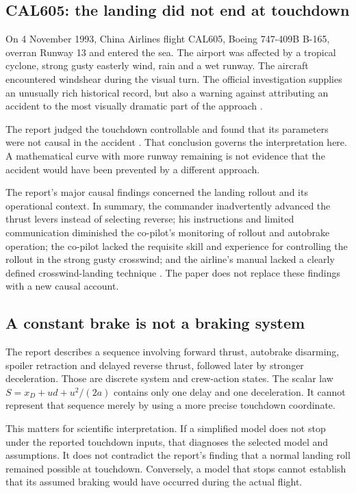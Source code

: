 \label{part:6}
\subsection*{CAL605: the landing did not end at touchdown}
On 4 November 1993, China Airlines flight CAL605, Boeing 747-409B B-165, overran Runway 13 and entered the sea. The airport was affected by a tropical cyclone, strong gusty easterly wind, rain and a wet runway. The aircraft encountered windshear during the visual turn. The official investigation supplies an unusually rich historical record, but also a warning against attributing an accident to the most visually dramatic part of the approach \citep{cad}.

The report judged the touchdown controllable and found that its parameters were not causal in the accident \citep[§2.6.5]{cad}. That conclusion governs the interpretation here. A mathematical curve with more runway remaining is not evidence that the accident would have been prevented by a different approach.

The report's major causal findings concerned the landing rollout and its operational context. In summary, the commander inadvertently advanced the thrust levers instead of selecting reverse; his instructions and limited communication diminished the co-pilot's monitoring of rollout and autobrake operation; the co-pilot lacked the requisite skill and experience for controlling the rollout in the strong gusty crosswind; and the airline's manual lacked a clearly defined crosswind-landing technique \citep[Synopsis; §3]{cad}. The paper does not replace these findings with a new causal account.

\subsection*{A constant brake is not a braking system}
The report describes a sequence involving forward thrust, autobrake disarming, spoiler retraction and delayed reverse thrust, followed later by stronger deceleration. Those are discrete system and crew-action states. The scalar law $S=x_D+ud+u^2/(2a)$ contains only one delay and one deceleration. It cannot represent that sequence merely by using a more precise touchdown coordinate.

This matters for scientific interpretation. If a simplified model does not stop under the reported touchdown inputs, that diagnoses the selected model and assumptions. It does not contradict the report's finding that a normal landing roll remained possible at touchdown. Conversely, a model that stops cannot establish that its assumed braking would have occurred during the actual flight.

